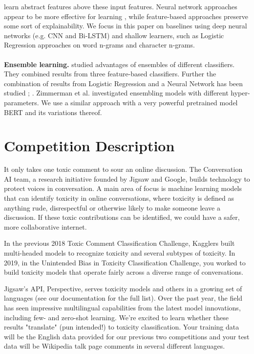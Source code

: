\documentclass[10pt,twocolumn,letterpaper]{article}
\begin{document}
learn abstract features above these input features. Neural network approaches appear to be more effective for learning \cite{r06}, while
feature-based approaches preserve some sort of
explainability. We focus in this paper on baselines using deep neural networks (e.g. CNN and
Bi-LSTM) and shallow learners, such as Logistic
Regression approaches on word n-grams and character n-grams.\\\\
\textbf{Ensemble learning.} \cite{r06} studied advantages of ensembles of different classifiers. They combined results from three
feature-based classifiers. Further the combination
of results from Logistic Regression and a Neural Network has been studied \cite{r34}; \cite{r35}. Zimmerman
et al. \cite{r36} investigated ensembling models with
different hyper-parameters. We use a similar approach with a very powerful pretrained model BERT and its variations thereof.

\section{Competition Description}

It only takes one toxic comment to sour an online discussion. The Conversation AI team, a research initiative founded by Jigsaw and Google, builds technology to protect voices in conversation. A main area of focus is machine learning models that can identify toxicity in online conversations, where toxicity is defined as anything rude, disrespectful or otherwise likely to make someone leave a discussion. If these toxic contributions can be identified, we could have a safer, more collaborative internet.

In the previous 2018 Toxic Comment Classification Challenge, Kagglers built multi-headed models to recognize toxicity and several subtypes of toxicity. In 2019, in the Unintended Bias in Toxicity Classification Challenge, you worked to build toxicity models that operate fairly across a diverse range of conversations. 

Jigsaw's API, Perspective, serves toxicity models and others in a growing set of languages (see our documentation for the full list). Over the past year, the field has seen impressive multilingual capabilities from the latest model innovations, including few- and zero-shot learning. We're excited to learn whether these results "translate" (pun intended!) to toxicity classification. Your training data will be the English data provided for our previous two competitions and your test data will be Wikipedia talk page comments in several different languages.
\end{document}

